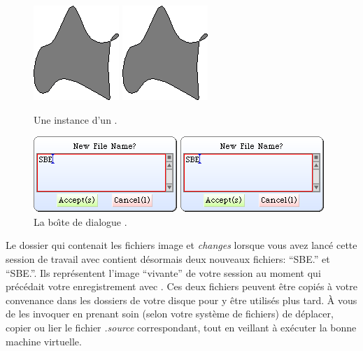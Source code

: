 \documentclass[a4paper,10pt,twoside]{book}
\begin{document}
\begin{figure}[htb]
\begin{minipage}[b]{0.48\textwidth}
\ifluluelse
	{\centerline{\includegraphics[scale=0.5]{Blob}}}
	{\centerline{\includegraphics[scale=0.7]{Blob}}}
	\caption{Une instance d'un .\label{fig:blob}}
\end{minipage}
\hfill
\begin{minipage}[b]{0.48\textwidth}
\ifluluelse
	{\centerline {\includegraphics[scale=0.5]{saveAs}}}
	{\centerline {\includegraphics[scale=0.7]{saveAs}}}
	\caption{La bo\^{\i}te de dialogue .\label{fig:saveas}}
\end{minipage}
\end{figure}


Le dossier qui contenait les fichiers image et \emph{changes} lorsque
vous avez lancé cette session de travail avec \sq contient d\'esormais
deux nouveaux fichiers: ``SBE.'' et ``SBE.''. 
Ils repr\'esentent l'image ``vivante'' de votre session \sq au moment qui précédait votre enregistrement avec .
Ces deux fichiers peuvent être copiés à votre convenance dans les
dossiers  de votre disque pour y être utilisés plus tard. \`A vous de
les invoquer en prenant soin (selon votre syst\`eme de fichiers) de
d\'eplacer, copier ou lier le fichier \emph{.source} correspondant,
tout en veillant \`a ex\'ecuter la bonne machine virtuelle.
\end{document}
